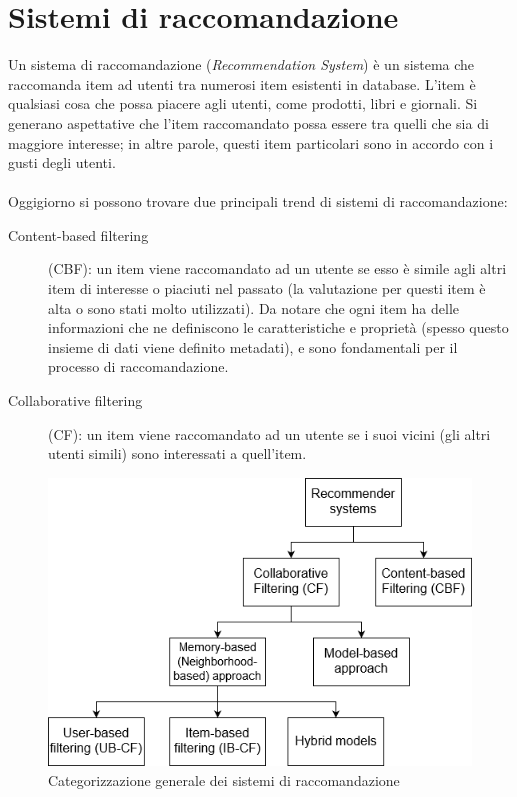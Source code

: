 \section{Sistemi di raccomandazione}
Un sistema di raccomandazione (\textit{Recommendation System}) è un sistema che raccomanda item ad utenti tra numerosi item esistenti 
in database. L'item è qualsiasi cosa che possa piacere agli utenti, come prodotti, libri e giornali. Si generano aspettative che 
l'item raccomandato possa essere tra quelli che sia di maggiore interesse; in altre parole, questi item particolari sono in accordo 
con i gusti degli utenti. 
\\
\\
Oggigiorno si possono trovare due principali trend di sistemi di raccomandazione: 
\begin{description}
	\item[Content-based filtering](CBF): un item viene raccomandato ad un utente se esso è simile agli altri item di interesse o piaciuti
	nel passato (la valutazione per questi item è alta o sono stati molto utilizzati). Da notare che ogni item ha delle informazioni che
	ne definiscono le caratteristiche e proprietà (spesso questo insieme di dati viene definito metadati), e sono fondamentali per il 
	processo di raccomandazione. 
	\item[Collaborative filtering](CF): un item viene raccomandato ad un utente se i suoi vicini (gli altri utenti simili) sono interessati
	a quell'item.   
\end{description}

\begin{figure}[ht!]
	\centering
	\includegraphics[scale=0.5]{images/recommender_systems.png}
	\caption{Categorizzazione generale dei sistemi di raccomandazione}
	\label{fig:recommender_systems}
\end{figure}

